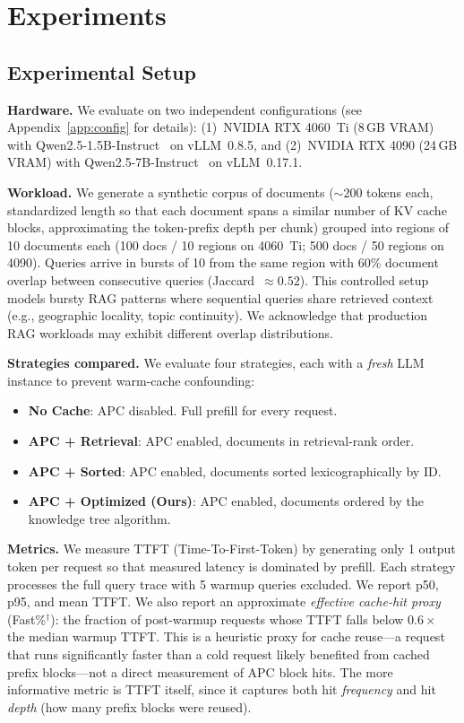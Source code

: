 \documentclass{article}
\begin{document}
\section{Experiments}
\label{sec:eval}

\subsection{Experimental Setup}

\textbf{Hardware.} We evaluate on two independent configurations (see Appendix~\ref{app:config} for details): (1)~NVIDIA RTX 4060~Ti (8\,GB VRAM) with Qwen2.5-1.5B-Instruct~\citep{qwen25tr} on vLLM~0.8.5, and (2)~NVIDIA RTX 4090 (24\,GB VRAM) with Qwen2.5-7B-Instruct~\citep{qwen25tr} on vLLM~0.17.1.

\textbf{Workload.} We generate a synthetic corpus of documents (${\sim}200$ tokens each, standardized length so that each document spans a similar number of KV cache blocks, approximating the token-prefix depth per chunk) grouped into regions of 10 documents each (100 docs / 10 regions on 4060~Ti; 500 docs / 50 regions on 4090). Queries arrive in bursts of 10 from the same region with 60\% document overlap between consecutive queries (Jaccard~$\approx 0.52$). This controlled setup models bursty RAG patterns where sequential queries share retrieved context (e.g., geographic locality, topic continuity). We acknowledge that production RAG workloads may exhibit different overlap distributions.

\textbf{Strategies compared.} We evaluate four strategies, each with a \emph{fresh} LLM instance to prevent warm-cache confounding:
\begin{itemize}
\item \textbf{No Cache}: APC disabled. Full prefill for every request.
\item \textbf{APC + Retrieval}: APC enabled, documents in retrieval-rank order.
\item \textbf{APC + Sorted}: APC enabled, documents sorted lexicographically by ID.
\item \textbf{APC + Optimized (Ours)}: APC enabled, documents ordered by the knowledge tree algorithm.
\end{itemize}

\textbf{Metrics.} We measure TTFT (Time-To-First-Token) by generating only 1 output token per request so that measured latency is dominated by prefill. Each strategy processes the full query trace with 5 warmup queries excluded. We report p50, p95, and mean TTFT. We also report an approximate \emph{effective cache-hit proxy} (Fast\%$^\dagger$): the fraction of post-warmup requests whose TTFT falls below $0.6\times$ the median warmup TTFT. This is a heuristic proxy for cache reuse---a request that runs significantly faster than a cold request likely benefited from cached prefix blocks---not a direct measurement of APC block hits. The more informative metric is TTFT itself, since it captures both hit \emph{frequency} and hit \emph{depth} (how many prefix blocks were reused).
\end{document}

